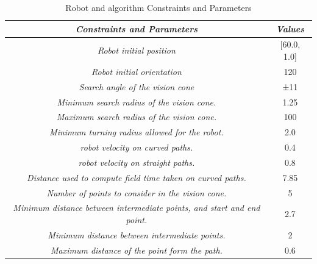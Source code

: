 \begin{table}[H] 
    \centering
    \caption{Robot and algorithm Constraints and Parameters}
    \label{tab:constraints_and_parameters_1}
    \begin{tabular}{|c|c|}
    \hline
    \rowcolor[HTML]{FFCC67} 
    \textit{\textbf{Constraints and Parameters}}                                    & \textit{\textbf{Values}} \\ \hline
    \rowcolor[HTML]{BBF6F4} 
    \textit{Robot initial position}                                                 & {[}60.0, 1.0{]}          \\ \hline
    \rowcolor[HTML]{BBF6F4} 
    \textit{Robot initial orientation}                                              & 120                      \\ \hline
    \rowcolor[HTML]{BBF6F4} 
    \textit{Search angle of the vision cone}                                        & ±11                      \\ \hline
    \rowcolor[HTML]{BBF6F4} 
    \textit{Minimum search radius of the vision cone.}                              & 1.25                     \\ \hline
    \rowcolor[HTML]{BBF6F4} 
    \textit{Maximum search radius of the vision cone.}                              & 100                      \\ \hline
    \rowcolor[HTML]{BBF6F4} 
    \textit{Minimum turning radius allowed for the robot.}                          & 2.0                      \\ \hline
    \rowcolor[HTML]{BBF6F4} 
    \textit{robot velocity on curved paths.}                                        & 0.4                      \\ \hline
    \rowcolor[HTML]{BBF6F4} 
    \textit{robot velocity on straight paths.}                                      & 0.8                      \\ \hline
    \rowcolor[HTML]{BBF6F4} 
    \textit{Distance used to compute field time taken on curved paths.}             & 7.85                     \\ \hline
    \rowcolor[HTML]{BBF6F4} 
    \textit{Number of points to consider in the vision cone.}                       & 5                        \\ \hline
    \rowcolor[HTML]{BEF7F5} 
    \textit{Minimum distance between intermediate points, and start and end point.} & 2.7                      \\ \hline
    \rowcolor[HTML]{BEF7F5} 
    \textit{Minimum distance between intermediate points.}                          & 2                        \\ \hline
    \rowcolor[HTML]{BEF7F5} 
    \textit{Maximum distance of the point form the path.}                           & 0.6                      \\ \hline
    \end{tabular}
    \end{table}



